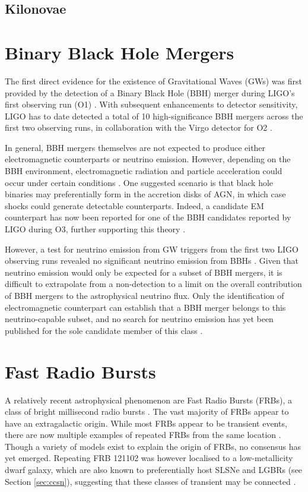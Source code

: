 \subsection{Kilonovae}

\section{Binary Black Hole Mergers}

The first direct evidence for the existence of Gravitational Waves (GWs) was first provided by the detection of a Binary Black Hole (BBH) merger during LIGO's first observing run (O1) . With subsequent enhancements to detector sensitivity,  LIGO has to date detected a total of 10 high-significance BBH mergers across the first two observing runs, in collaboration with the Virgo detector for O2 . 

In general, BBH mergers themselves are not expected to produce either electromagnetic counterparts or neutrino emission. However, depending on the BBH environment, electromagnetic radiation and particle acceleration could occur under certain conditions . One suggested scenario is that black hole binaries may preferentially form in the accretion disks of AGN, in which case shocks could generate detectable counterparts. Indeed, a candidate EM counterpart has now been reported for one of the BBH candidates reported by LIGO during O3, further supporting this theory .

However, a test for neutrino emission from GW triggers from the first two LIGO observing runs revealed no significant neutrino emission from BBHs . Given that neutrino emission would only be expected for a subset of BBH mergers, it is difficult to extrapolate from a non-detection to a limit on the overall contribution of BBH mergers to the astrophysical neutrino flux. Only the identification of electromagnetic counterpart can establish that a BBH merger belongs to this neutrino-capable subset, and no search for neutrino emission has yet been published for the sole candidate member of this class \cite{graham_gw_20}.

\section{Fast Radio Bursts}

A relatively recent astrophysical phenomenon are Fast Radio Bursts (FRBs), a class of bright millisecond radio bursts . The vast majority of FRBs appear to have an extragalactic origin. While most FRBs appear to be transient events, there are now multiple examples of repeated FRBs from the same location . Though a variety of models exist to explain the origin of FRBs, no consensus has yet emerged. Repeating FRB 121102 was however localised to a low-metallicity dwarf galaxy, which are also known to preferentially host SLSNe and LGBRs (see Section \ref{sec:ccsn}), suggesting that these classes of transient may be connected . 

